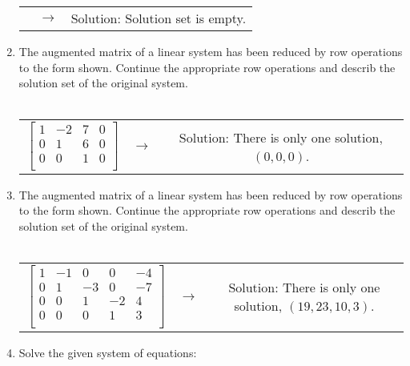 \documentclass{article}
\begin{document}
\begin{enumerate}
\begin{tabular}{c c c}
        & $\rightarrow$ &  

        Solution: Solution set is empty.

    \end{tabular}

    \item The augmented matrix of a linear system has been reduced by row operations to the form shown. Continue the appropriate row operations and describ the solution set of the original system.\\ \\ 
    \begin{tabular}{c c c}

        $\begin{bmatrix}
        1 & -2 & 7 & 0 \\ 
        0 & 1 & 6 & 0 \\
        0 & 0 & 1 & 0 \\
        \end{bmatrix}$

        & $\rightarrow$ &  

        Solution: There is only one solution, $(0,0,0)$.

    \end{tabular}

    \item The augmented matrix of a linear system has been reduced by row operations to the form shown. Continue the appropriate row operations and describ the solution set of the original system.\\ \\ 
    \begin{tabular}{c c c}

        $\begin{bmatrix}
        1 & -1 & 0 & 0 & -4 \\
        0 & 1 & -3 & 0 & -7 \\
        0 & 0 & 1 & -2 & 4 \\
        0 & 0 & 0 & 1 & 3 \\
        \end{bmatrix}$

        & $\rightarrow$ &  

        Solution: There is only one solution, $(19, 23, 10, 3)$.

    \end{tabular}

    \item Solve the given system of equations: \\  \\
    \begin{tabular}{c c c}


\end{tabular}
\end{enumerate}
\end{document}
